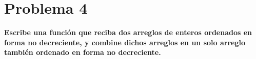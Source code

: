 \section*{Problema 4}
\textbf{Escribe una función que reciba dos arreglos de enteros ordenados en forma no decreciente, y combine dichos arreglos en un solo arreglo también ordenado en forma no decreciente.}